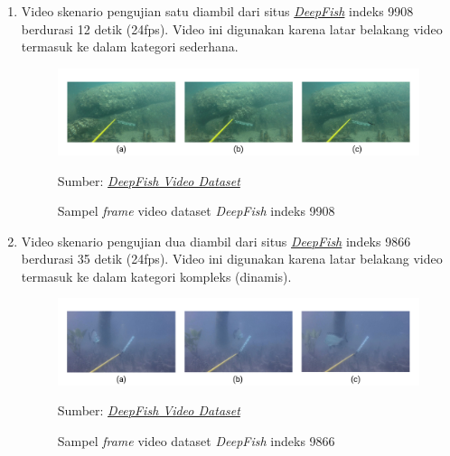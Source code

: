             \begin{enumerate}
                \item Video skenario pengujian satu diambil dari situs \href{https://alzayats.github.io/DeepFish/}{\textit{DeepFish}} 
                indeks 9908 berdurasi 12 detik (24fps). Video ini digunakan karena latar belakang video termasuk ke dalam kategori sederhana.
                \vspace{-0.5cm}
                \begin{figure}[H]
                \centering
                  \singlespacing
                  \captionsetup{justification=centering,margin=0.5cm}
                  \includegraphics[width=12cm]{image/sample_frame_9908.jpg}
                  \caption{Sampel \textit{frame} video dataset \textit{DeepFish} indeks 9908}
                  \small{Sumber: \href{https://alzayats.github.io/DeepFish/}{\textit{DeepFish Video Dataset}}}
                  \label{fig:sample_9908}
                \end{figure}
                \item Video skenario pengujian dua diambil dari situs \href{https://alzayats.github.io/DeepFish/}{\textit{DeepFish}} 
                indeks 9866 berdurasi 35 detik (24fps). Video ini digunakan karena latar belakang video termasuk ke dalam kategori kompleks (dinamis).
                \vspace{-0.5cm}
                \begin{figure}[H]
                \centering
                  \singlespacing
                  \captionsetup{justification=centering,margin=0.5cm}
                  \includegraphics[width=12cm]{image/sample_frame_9866.jpg}
                  \caption{Sampel \textit{frame} video dataset \textit{DeepFish} indeks 9866}
                  \small{Sumber: \href{https://alzayats.github.io/DeepFish/}{\textit{DeepFish Video Dataset}}}
                  \label{fig:sample_9866}

\end{figure}
\end{enumerate}
